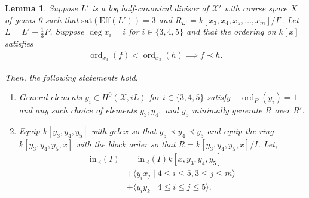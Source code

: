 \documentclass{amsart}
\theoremstyle{plain}
\newtheorem{lem}[thm]{Lemma}
\theoremstyle{definition}
\theoremstyle{remark}
\numberwithin{equation}{section}
\newcommand \sx{\mathscr X}
\DeclareMathOperator{\ord}{ord}
\newcommand \halfcan{L}
\newcommand \initial{\text{in}}
\newcommand \Eff{\text{Eff}}
\newcommand \sat{\text{sat}}
\begin{document}
\begin{lem}
\label{lem:sat-3}
Suppose $L'$ is a log half-canonical divisor of $\sx'$ with course
space $X$ of genus 0 such that $\sat(\Eff(\halfcan')) = 3$ and $R_
{\halfcan'} = k[x_3, x_4 , x_5, \ldots, x_m]/I'$. Let $L = L' + \frac
{1}{3}P$. Suppose $\deg x_i = i$ for $i \in \{3, 4, 5\}$ and that
the ordering on $k[x]$ satisfies
\begin{align*}
	\ord_{x_3}(f) < \ord_{x_3}(h) \implies f \prec h.
\end{align*}

\noindent
Then, the following statements hold.

\begin{enumerate}
	\item[(a)] General elements  $y_i \in H^0(\sx, iL)$ for $i \in \{3,
		4,5\}$ satisfy $-\ord_P(y_i) = 1$ and any such choice of elements $y
		_3, y_4,$ and $y_5$ minimally generate $R$ over $R'$.
	\item[(b)] Equip $k[y_3, y_4, y_5]$ with $grlex$ so that $y_5 \prec 
		y_4 \prec y_3$
		and equip the ring $k[y_3, y_4, y_5, x]$ with the block 
		order so that $R = k[y_3, y_4, y_5, x]/I$. Let,
		\begin{align*}
			\initial_\prec(I) &= \initial_\prec(I) k[x, y_3, y_4, y_5] \\
			&+ \langle y_i x_j \mid 4 \leq i \leq 5, 3 \leq j \leq m\rangle \\
			&+ \langle y_i y_k \mid 4 \leq i \leq j \leq 5\rangle.
		\end{align*}
\end{enumerate}
\end{lem}
\end{document}
